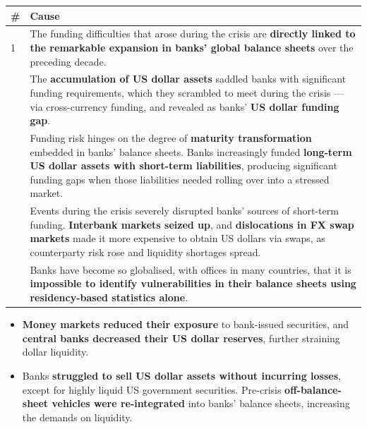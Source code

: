 \begin{center}
\small
\begin{tabularx}{\textwidth}{@{}p{0.5cm} X@{}}
\toprule
\rowcolor{FRMSoft}\textbf{\#} & \textbf{Cause} \\
\midrule
1 & The funding difficulties that arose during the crisis are \textbf{directly linked to the remarkable expansion in banks' global balance sheets} over the preceding decade. \\
\addlinespace
2 & The \textbf{accumulation of US dollar assets} saddled banks with significant funding requirements, which they scrambled to meet during the crisis --- via cross-currency funding, and revealed as banks' \textbf{US dollar funding gap}. \\
\addlinespace
3 & Funding risk hinges on the degree of \textbf{maturity transformation} embedded in banks' balance sheets. Banks increasingly funded \textbf{long-term US dollar assets with short-term liabilities}, producing significant funding gaps when those liabilities needed rolling over into a stressed market. \\
\addlinespace
4 & Events during the crisis severely disrupted banks' sources of short-term funding. \textbf{Interbank markets seized up}, and \textbf{dislocations in FX swap markets} made it more expensive to obtain US dollars via swaps, as counterparty risk rose and liquidity shortages spread. \\
\addlinespace
5 & Banks have become so globalised, with offices in many countries, that it is \textbf{impossible to identify vulnerabilities in their balance sheets using residency-based statistics alone}. \\
\bottomrule
\end{tabularx}
\end{center}

\begin{lrkeybox}
\begin{itemize}
\item \textbf{Money markets reduced their exposure} to bank-issued securities, and \textbf{central banks decreased their US dollar reserves}, further straining dollar liquidity.
\item Banks \textbf{struggled to sell US dollar assets without incurring losses}, except for highly liquid US government securities. Pre-crisis \textbf{off-balance-sheet vehicles were re-integrated} into banks' balance sheets, increasing the demands on liquidity.
\end{itemize}
\end{lrkeybox}

